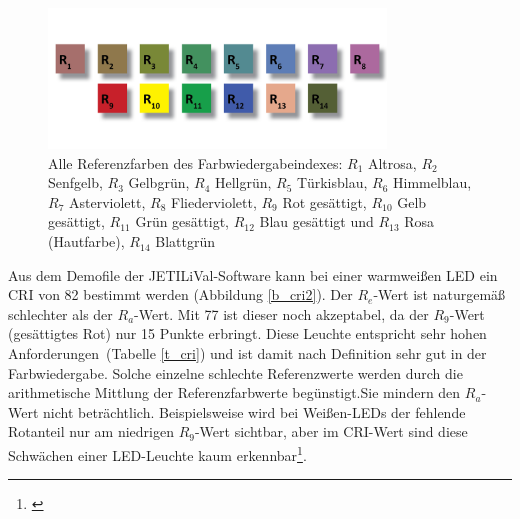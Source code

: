 \begin{figure}[H]     %
\centering
\includegraphics[width=0.8\textwidth]{bilder/cri} 
\caption {Alle Referenzfarben des Farbwiedergabeindexes: $R_{1}$ Altrosa, $R_{2}$ Senfgelb, $R_{3}$ Gelbgrün, $R_{4}$ Hellgrün, $R_{5}$ Türkisblau, $R_{6}$ Himmelblau, $R_{7}$ Asterviolett, $R_{8}$ Fliederviolett, $R_{9}$ Rot gesättigt, $R_{10}$ Gelb gesättigt, $R_{11}$ Grün gesättigt, $R_{12}$ Blau gesättigt und $R_{13}$ Rosa (Hautfarbe), $R_{14}$ Blattgrün \protect\footnotemark}\label{b_cri}
\end{figure}


\noindent Aus dem Demofile der JETI\glqq LiVal\grqq -Software kann bei einer warmweißen LED ein CRI von 82 bestimmt werden (Abbildung \ref{b_cri2}). Der $R_{e}$-Wert ist naturgemäß schlechter als der $R_{a}$-Wert. Mit 77 ist dieser noch akzeptabel, da der $R_{9}$-Wert (gesättigtes Rot) nur 15 Punkte erbringt. Diese Leuchte entspricht \glqq sehr hohen Anforderungen\grqq\ (Tabelle \ref{t_cri}) und ist damit nach Definition sehr gut in der Farbwiedergabe. Solche einzelne schlechte Referenzwerte werden durch die arithmetische Mittlung der Referenzfarbwerte begünstigt.Sie mindern den $R_{a}$-Wert nicht beträchtlich. Beispielsweise wird bei Weißen-LEDs der fehlende Rotanteil nur am niedrigen $R_{9}$-Wert sichtbar, aber im CRI-Wert sind diese Schwächen einer LED-Leuchte kaum erkennbar\footnote{\cite{davis_ohno}}. 

